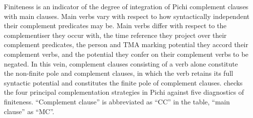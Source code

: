 Finiteness is an indicator of the degree of integration of Pichi complement clauses with main clauses. Main verbs vary with respect to how syntactically independent their complement predicates may be. Main verbs differ with respect to the complementiser they occur with, the time reference they project over their complement predicates, the person and TMA marking potential they accord their complement verbs, and the potential they confer on their complement verbs to be negated. In this vein, complement clauses consisting of a verb alone constitute the non-finite pole and complement clauses, in which the verb retains its full syntactic potential and constitutes the finite pole of complement clauses.  checks the four principal complementation strategies in Pichi against five diagnostics of finiteness. “Complement clause” is abbreviated as “CC” in the table, “main clause” as “MC”.

